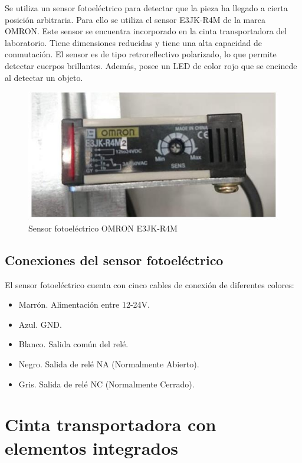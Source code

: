 Se utiliza un sensor fotoeléctrico para detectar que la pieza ha llegado a cierta posición arbitraria.
Para ello se utiliza el sensor E3JK-R4M de la marca OMRON. Este sensor se encuentra incorporado en la cinta
transportadora del laboratorio. Tiene dimensiones reducidas y tiene una alta capacidad de conmutación. El 
sensor es de tipo retroreflectivo polarizado, lo que permite detectar cuerpos brillantes. Además, posee un
LED de color rojo que se encinede al detectar un objeto.

\begin{figure}[hbtp]
    \centering
    \includegraphics[scale=0.5]{02-hardware/09-omron.png}
    \caption{Sensor fotoeléctrico OMRON E3JK-R4M}
    \label{fig:figura29}
    \end{figure}

\subsection{Conexiones del sensor fotoeléctrico}

El sensor fotoeléctrico cuenta con cinco cables de conexión de diferentes colores:
\begin{itemize}
    \item Marrón. Alimentación entre 12-24V.
    \item Azul. GND.
    \item Blanco. Salida común del relé.
    \item Negro. Salida de relé NA (Normalmente Abierto).
    \item Gris. Salida de relé NC (Normalmente Cerrado).
\end{itemize}

\section{Cinta transportadora con elementos integrados}

